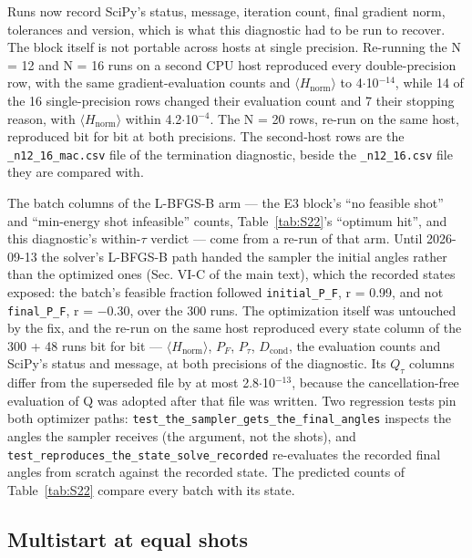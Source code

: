 \documentclass[journal]{IEEEtran}
\begin{document}
Runs now record SciPy's status, message, iteration count, final gradient norm, tolerances and version, which is what this diagnostic had to be run to recover. The block itself is not portable across hosts at single precision. Re-running the N = 12 and N = 16 runs on a second CPU host reproduced every double-precision row, with the same gradient-evaluation counts and $\langle$$H_{\mathrm{norm}}$$\rangle$ to 4$\cdot$10$^{-14}$, while 14 of the 16 single-precision rows changed their evaluation count and 7 their stopping reason, with $\langle$$H_{\mathrm{norm}}$$\rangle$ within 4.2$\cdot$10$^{-4}$. The N = 20 rows, re-run on the same host, reproduced bit for bit at both precisions. The second-host rows are the \texttt{\_n12\_16\_mac.csv} file of the termination diagnostic, beside the \texttt{\_n12\_16.csv} file they are compared with.


The batch columns of the L-BFGS-B arm --- the E3 block's ``no feasible shot'' and ``min-energy shot infeasible'' counts, Table~\ref{tab:S22}'s ``optimum hit'', and this diagnostic's within-$\tau$ verdict --- come from a re-run of that arm. Until 2026-09-13 the solver's L-BFGS-B path handed the sampler the initial angles rather than the optimized ones (Sec. VI-C of the main text), which the recorded states exposed: the batch's feasible fraction followed \texttt{initial\_P\_F}, r = 0.99, and not \texttt{final\_P\_F}, r = $-$0.30, over the 300 runs. The optimization itself was untouched by the fix, and the re-run on the same host reproduced every state column of the 300 + 48 runs bit for bit --- $\langle$$H_{\mathrm{norm}}$$\rangle$, $P_{F}$, $P_{\tau}$, $D_{\mathrm{cond}}$, the evaluation counts and SciPy's status and message, at both precisions of the diagnostic. Its $Q_{\tau}$ columns differ from the superseded file by at most 2.8$\cdot$10$^{-13}$, because the cancellation-free evaluation of Q was adopted after that file was written. Two regression tests pin both optimizer paths: \texttt{test\_the\_sampler\_gets\_the\_final\_angles} inspects the angles the sampler receives (the argument, not the shots), and \texttt{test\_reproduces\_the\_state\_solve\_recorded} re-evaluates the recorded final angles from scratch against the recorded state. The predicted counts of Table~\ref{tab:S22} compare every batch with its state.


\subsection{Multistart at equal shots}
\end{document}
